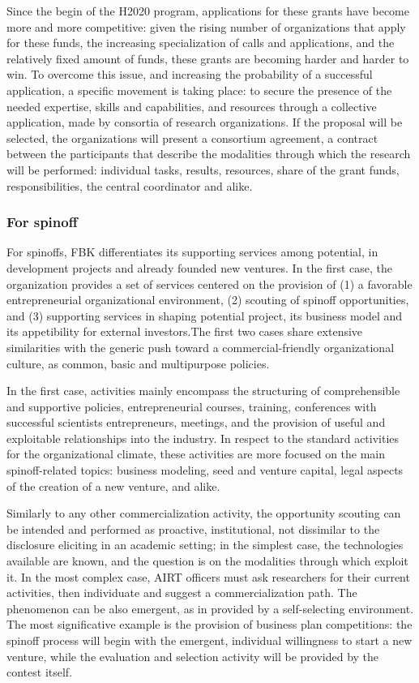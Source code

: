 Since the begin of the H2020 program, applications for these grants have become more and more competitive: given the rising number of organizations that apply for these funds, the increasing specialization of calls and applications, and the relatively fixed amount of funds, these grants are becoming harder and harder to win. To overcome this issue, and increasing the probability of a successful application, a specific movement is taking place: to secure the presence of the needed expertise, skills and capabilities, and resources through a collective application, made by consortia of research organizations. If the proposal will be selected, the organizations will present a consortium agreement, a contract between the participants that describe the modalities through which the research will be performed: individual tasks, results, resources, share of the grant funds, responsibilities, the central coordinator and alike. 

\subsubsection{For spinoff}

For spinoffs, FBK differentiates its supporting services among potential, in development projects and already founded new ventures. In the first case, the organization provides a set of services centered on the provision of (1) a favorable entrepreneurial organizational environment, (2) scouting of spinoff opportunities, and (3) supporting services in shaping potential project, its business model and its appetibility for external investors.The first two cases share extensive similarities with the generic push toward a commercial-friendly organizational culture, as common, basic and multipurpose policies.

In the first case, activities mainly encompass the structuring of comprehensible and supportive policies,  entrepreneurial courses, training, conferences with successful scientists entrepreneurs, meetings, and the provision of useful and exploitable relationships into the industry. In respect to the standard activities for the organizational climate, these activities are more focused on the main spinoff-related topics: business modeling, seed and venture capital, legal aspects of the creation of a new venture, and alike. 

Similarly to any other commercialization activity, the opportunity scouting can be intended and performed as proactive, institutional, not dissimilar to the disclosure eliciting in an academic setting; in the simplest case, the technologies available are known, and the question is on the modalities through which exploit it. In the most complex case, AIRT officers must ask researchers for their current activities, then individuate and suggest a commercialization path. The phenomenon can be also emergent, as in provided by a self-selecting environment. The most significative example is the provision of business plan competitions: the spinoff process will begin with the emergent, individual willingness to start a new venture, while the evaluation and selection activity will be provided by the contest itself.

